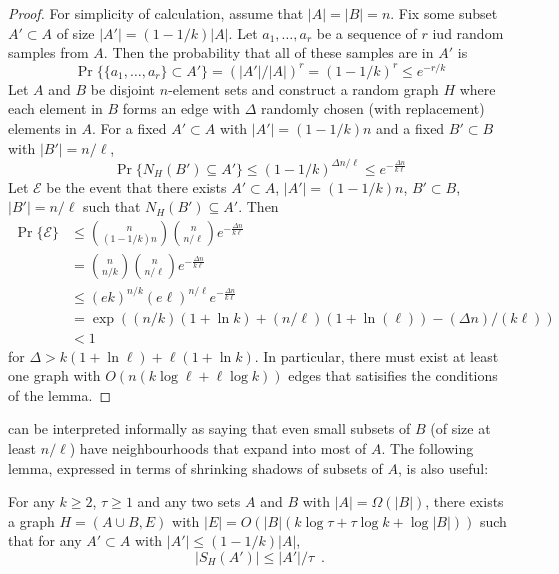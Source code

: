 \documentclass{patmorin}
\begin{document}
\begin{proof}
  For simplicity of calculation, assume that $|A|=|B|=n$.  Fix some
  subset $A'\subset A$ of size $|A'|=(1-1/k)|A|$.  Let $a_1,\ldots,a_r$
  be a sequence of $r$ iud random samples from $A$.  Then the probability
  that all of these samples are in $A'$ is
  \[
     \Pr\{\{a_1,\ldots,a_r\}\subset A'\} = (|A'|/|A|)^r = (1-1/k)^r \le e^{-r/k}
  \]
  Let $A$ and $B$ be disjoint $n$-element sets and construct a random
  graph $H$ where each element in $B$ forms an edge with $\Delta$ randomly
  chosen (with replacement) elements in $A$.  For a fixed $A'\subset A$
  with $|A'|=(1-1/k)n$ and a fixed $B'\subset B$ with $|B'| = n/\ell$,
  \[
    \Pr\{N_H(B') \subseteq A'\} 
        \le (1-1/k)^{\Delta n/\ell} 
        \le e^{-\frac{\Delta n}{k\ell}}
  \]
  Let $\mathcal{E}$ be the event that there exists $A'\subset
  A$, $|A'|=(1-1/k)n$, $B'\subset B$, $|B'|=n/\ell$ such that
  $N_H(B')\subseteq A'$.  Then
  \begin{align*}
    \Pr\{\mathcal{E}\} 
        & \le \binom{n}{(1-1/k)n}\binom{n}{n/\ell}e^{-\frac{\Delta n}{k\ell}} \\
        & = \binom{n}{n/k}\binom{n}{n/\ell}e^{-\frac{\Delta n}{k\ell}} \\
        & \le (ek)^{n/k} (e\ell)^{n/\ell}e^{-\frac{\Delta n}{k\ell}} \\
        & = \exp((n/k)(1+\ln k) + (n/\ell)(1+\ln(\ell)) - (\Delta n)/(k\ell)) \\
        & < 1
  \end{align*}
  for $\Delta > k(1+\ln \ell) + \ell(1+\ln k)$.  In particular, there
  must exist at least one graph with $O(n(k\log\ell + \ell\log k))$
  edges that satisifies the conditions of the lemma.
\end{proof}

 can be interpreted informally as saying that even small
subsets of $B$ (of size at least $n/\ell$) have neighbourhoods that
expand into most of $A$.  The following lemma, expressed in terms of
shrinking shadows of subsets of $A$, is also useful:

\begin{lem}
   For any $k\ge 2$, $\tau\ge 1$ and any two sets $A$ and $B$ with
   $|A|=\Omega(|B|)$, there exists a graph $H=(A\cup B,E)$ with $|E|=O(|B|(k\log
   \tau + \tau\log k + \log|B|))$ such that for any $A'\subset A$ with $|A'|\le
   (1-1/k)|A|$,
   \[ |S_H(A')| \le |A'|/\tau \enspace .\]
\end{lem}
\end{document}
